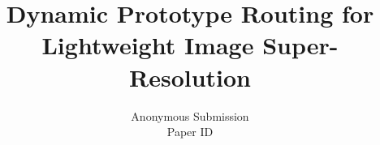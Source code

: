 \documentclass[10pt,twocolumn,letterpaper]{article}
\title{Dynamic Prototype Routing for Lightweight Image Super-Resolution}
\author{Anonymous Submission\\
Paper ID \paperID
}
\begin{document}
\maketitle





















{
    \small
    
    
}
\end{document}
